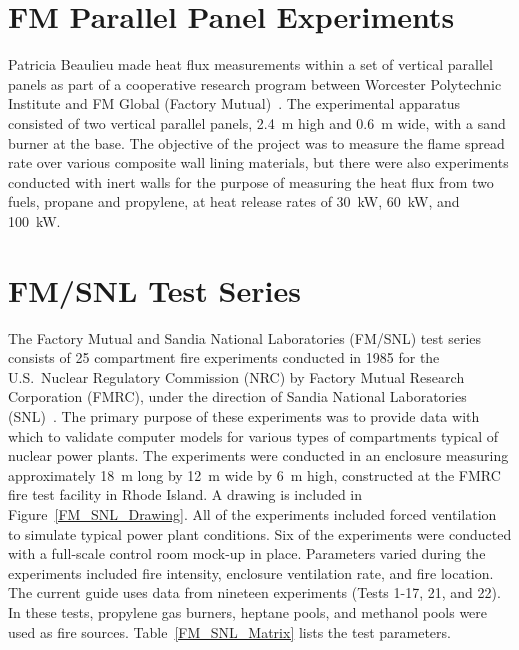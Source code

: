 \section{FM Parallel Panel Experiments}

Patricia Beaulieu made heat flux measurements within a set of vertical parallel panels as part of a cooperative research
program between Worcester Polytechnic Institute and FM Global (Factory Mutual)~\cite{Beaulieu:FM}. The experimental
apparatus consisted of two vertical parallel
panels, 2.4~m high and 0.6~m wide, with a sand burner at the base. The objective of the project was to measure the flame spread
rate over various composite wall lining materials, but there were also experiments conducted with inert walls for the purpose of measuring the
heat flux from two fuels, propane and propylene, at heat release rates of 30~kW, 60~kW, and 100~kW.



\section{FM/SNL Test Series}


The Factory Mutual and Sandia National Laboratories (FM/SNL) test series consists of 25 compartment fire
experiments conducted in 1985 for the U.S.~Nuclear Regulatory Commission (NRC) by Factory Mutual Research Corporation (FMRC), under
the direction of Sandia National Laboratories (SNL)~\cite{Nowlen:NUREG4681,Nowlen:NUREG4527}. The primary purpose of these experiments was to
provide data with which to validate computer models for various types of compartments typical of nuclear power plants. The
experiments were conducted in an enclosure measuring approximately 18~m long by 12~m wide by 6~m high, constructed at the FMRC fire test facility in Rhode Island.
A drawing is included in Figure~\ref{FM_SNL_Drawing}. All of the experiments included forced ventilation to simulate typical power plant conditions. Six of
the experiments were conducted with a full-scale control room mock-up in place. Parameters varied
during the experiments included fire intensity, enclosure ventilation rate, and fire location.
The current guide uses data from nineteen experiments (Tests 1-17, 21, and 22).
In these tests,  propylene gas burners, heptane pools, and methanol pools were used as fire sources.
Table~\ref{FM_SNL_Matrix} lists the test parameters.

